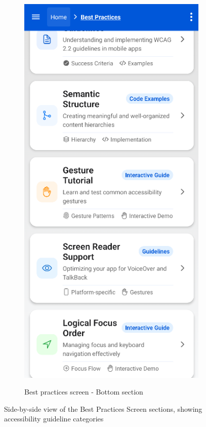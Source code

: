 \begin{figure}[ht]
\begin{subfigure}[b]{0.48\textwidth}
        \centering
        \includegraphics[width=\linewidth, alt={Second part of the Best Practices Screen}]{img/practices2.png}
        \caption{Best practices screen - Bottom section}
        \label{fig:best-practices-bottom}
    \end{subfigure}
    \caption{Side-by-side view of the Best Practices Screen sections, showing accessibility guideline categories}
    \label{fig:best_practices_screens_sidebyside}
\end{figure}

